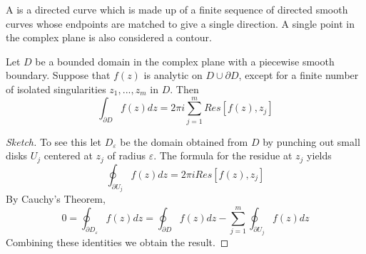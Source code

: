 \documentclass[12pt, a4paper, oneside, openright, titlepage]{book}
\begin{document}
\begin{defn}
    A  is a directed curve which is made up of a finite sequence of directed smooth curves whose endpoints are matched to give a single direction. A single point in the complex plane is also considered a contour.
\end{defn}




\begin{namthm}
    Let $D$ be a bounded domain in the complex plane with a piecewise smooth boundary. Suppose that $f(z)$ is analytic on $D\cup \partial D$, except for a finite number of isolated singularities $z_1,...,z_m$ in $D$. Then \begin{equation*}
        \int_{\partial D}f(z)dz = 2\pi i\sum_{j=1}^mRes[f(z),z_j]
    \end{equation*}
\end{namthm}
\begin{proof}[Sketch]
    To see this let $D_{\varepsilon}$ be the domain obtained from $D$ by punching out small disks $U_j$ centered at $z_j$ of radius $\varepsilon$. The formula for the residue at $z_j$ yields \begin{equation*}
        \oint_{\partial U_j}f(z)dz = 2\pi iRes[f(z),z_j]
    \end{equation*}
    By Cauchy's Theorem, \begin{equation*}
        0 = \oint_{\partial D_{\varepsilon}}f(z)dz = \oint_{\partial D}f(z)dz - \sum_{j=1}^{m}\oint_{\partial U_j}f(z)dz
    \end{equation*}
    Combining these identities we obtain the result.
\end{proof}
\end{document}

